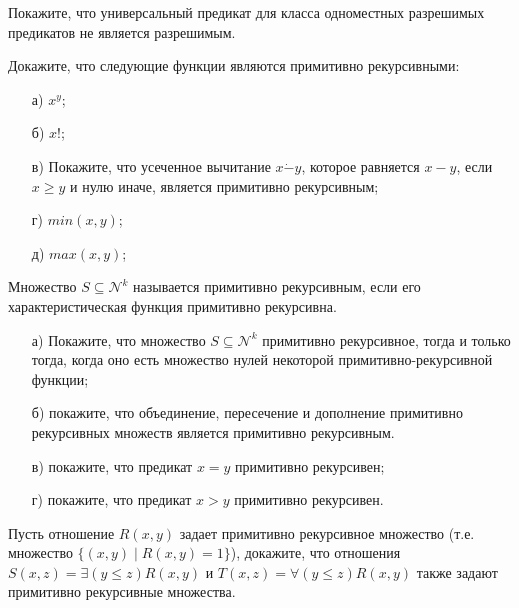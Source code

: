 
\newcommand{\dom}[2]{\left[\frac{#1}{#2}\right]}

\begin{task}
	Покажите, что универсальный предикат для класса одноместных разрешимых предикатов не является разрешимым.
\end{task}


\begin{task}
    Докажите, что следующие функции являются примитивно рекурсивными:
    \begin{enumerate}[topsep = 0pt, itemsep = -1ex]
        \item [а)] $x^y$;
        \item [б)] $x!$;
        \item [в)] Покажите, что усеченное вычитание $x \dot{-} y$, которое равняется $x - y$, если $x \ge y$ и нулю иначе,
			является примитивно рекурсивным; 
    	\item [г)] $min(x, y)$;
        \item [д)] $max(x, y)$;
    \end{enumerate}
\end{task}


Множество $S \subseteq \mathcal{N}^k$ называется примитивно рекурсивным, если его характеристическая функция примитивно
рекурсивна.

\begin{task}	
    \begin{enumerate}[topsep = 0pt, itemsep = -1ex]
        \item [а)] Покажите, что множество $S \subseteq \mathcal{N}^k$ примитивно рекурсивное, тогда и только тогда, когда оно
			есть множество нулей некоторой примитивно-рекурсивной функции;
        \item [б)] покажите, что объединение, пересечение и дополнение примитивно рекурсивных множеств является примитивно
			рекурсивным.
        \item [в)] покажите, что предикат $x = y$ примитивно рекурсивен;
        \item [г)] покажите, что предикат $x > y$ примитивно рекурсивен.
    \end{enumerate}
\end{task}


\begin{task}
    Пусть отношение $R(x, y)$ задает примитивно рекурсивное множество (т.е. множество $\{(x, y) \mid R(x, y) = 1\}$), докажите,
    что отношения $S(x, z) = \exists (y \le z) R(x, y)$ и $T(x, z) = \forall (y \le z) R(x, y)$ также задают примитивно
    рекурсивные множества.
\end{task}

